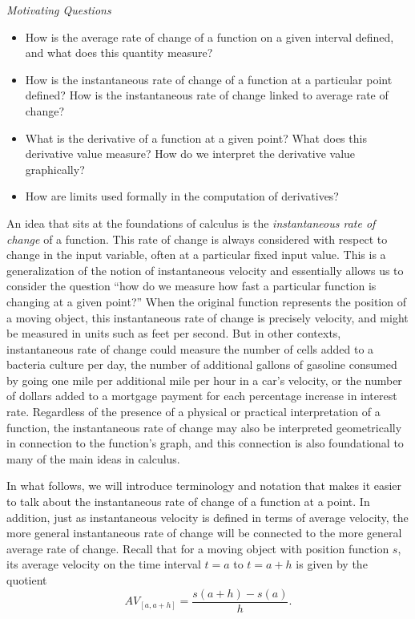 \documentclass[10pt,]{book}
\theoremstyle{plain}
\theoremstyle{definition}
\theoremstyle{definition}
\theoremstyle{definition}
\theoremstyle{definition}
\theoremstyle{definition}
\numberwithin{equation}{section}
\begin{document}
\emph{Motivating Questions}
%
\leavevmode%
\begin{itemize}[label=\textbullet]
\item{}How is the average rate of change of a function on a given interval defined, and what does this quantity measure?%
\item{}How is the instantaneous rate of change of a function at a particular point defined?  How is the instantaneous rate of change linked to average rate of change?%
\item{}What is the derivative of a function at a given point?  What does this derivative value measure? How do we interpret the derivative value graphically?%
\item{}How are limits used formally in the computation of derivatives?%
\end{itemize}
\par

An idea that sits at the foundations of calculus is the \emph{instantaneous rate of change} of a function. This rate of change is always considered with respect to change in the input variable, often at a particular fixed input value. This is a generalization of the notion of instantaneous velocity and essentially allows us to consider the question ``how do we measure how fast a particular function is changing at a given point?'' When the original function represents the position of a moving object, this instantaneous rate of change is precisely velocity, and might be measured in units such as feet per second. But in other contexts, instantaneous rate of change could measure the number of cells added to a bacteria culture per day, the number of additional gallons of gasoline consumed by going one mile per additional mile per hour in a car's velocity, or the number of dollars added to a mortgage payment for each percentage increase in interest rate. Regardless of the presence of a physical or practical interpretation of a function, the instantaneous rate of change may also be interpreted geometrically in connection to the function's graph, and this connection is also foundational to many of the main ideas in calculus.
%
\par

In what follows, we will introduce terminology and notation that makes it easier to talk about the instantaneous rate of change of a function at a point. In addition, just as instantaneous velocity is defined in terms of average velocity, the more general instantaneous rate of change will be connected to the more general average rate of change. Recall that for a moving object with position function \(s\), its average velocity on the time interval \(t = a\) to \(t = a+h\) is given by the quotient
%
\begin{equation*}
AV_{[a,a+h]} = \frac{s(a+h)-s(a)}{h}.
\end{equation*}\par
\end{document}
